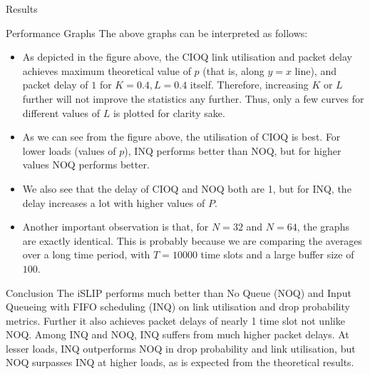 \begin{section}{Results}
\begin{subsection}{Performance Graphs}
    The above graphs can be interpreted as follows:
    \begin{itemize}
        \item As depicted in the figure above, the CIOQ link utilisation and packet delay achieves maximum theoretical value of $p$ (that is, along $y=x$ line), and packet delay of $1$ for $K=0.4, L=0.4$ itself. Therefore, increasing $K$ or $L$ further will not improve the statistics any further. Thus, only a few curves for different values of $L$ is plotted for clarity sake. 
        \item As we can see from the figure above, the utilisation of CIOQ is best. For lower loads (values of $p$), INQ performs better than NOQ, but for higher values NOQ performs better. 
        \item We also see that the delay of CIOQ and NOQ both are 1, but for INQ, the delay increases a lot with higher values of $P$.
        \item Another important observation is that, for $N=32$ and $N=64$, the graphs are exactly identical. This is probably because we are comparing the averages over a long time period, with $T=10000$ time slots and a large buffer size of $100$.
    \end{itemize}

    \end{subsection}
    

\end{section}

\begin{section}{Conclusion}
    The iSLIP performs much better than No Queue (NOQ) and Input Queueing with FIFO scheduling (INQ) on link utilisation and drop probability metrics. Further it also achieves packet delays of nearly 1 time slot not unlike NOQ. Among INQ and NOQ, INQ suffers from much higher packet delays. At lesser loads, INQ outperforms NOQ in drop probability and link utilisation, but NOQ surpasses INQ at higher loads, as is expected from the theoretical results.  
\end{section}
